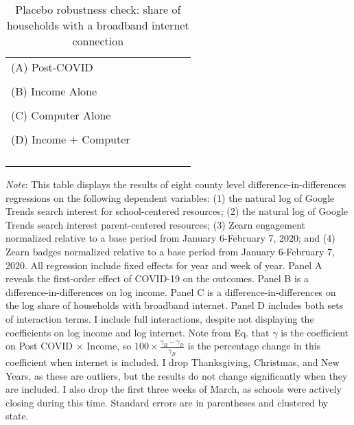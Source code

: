 \begin{table}[hbtp!]
    \caption{Placebo robustness check: share of households with a broadband internet connection}
    \label{tab:placebo_internet}
  \centering
  \begin{tabular}{l c c c c c}
    \toprule
     \\
    \midrule
    (A) Post-COVID \\
    \midrule
     \\
    \midrule
    (B) Income Alone \\
    \midrule
     \\
    \midrule
    (C) Computer Alone \\
    \midrule
     \\
    \midrule
    (D) Income + Computer \\
    \midrule
     \\
    \midrule
     \\
    \midrule
     \\
    \bottomrule \\
  \end{tabular}
  \begin{minipage}{\textwidth}
      \footnotesize
      \textit{Note}: This table displays the results of eight county level difference-in-differences regressions on the following dependent variables: (1) the natural log of Google Trends search interest for school-centered resources; (2) the natural log of Google Trends search interest parent-centered resources;  (3) Zearn engagement normalized relative to a base period from January 6-February 7,  2020; and (4) Zearn badges normalized relative to a base period from January 6-February 7,  2020. All regression include fixed effects for year and week of year.
      Panel A reveals the first-order effect of COVID-19 on the outcomes.
      Panel B is a difference-in-differences on log income.
      Panel C is a difference-in-differences on the log share of households with broadband internet.
      Panel D includes both sets of interaction terms.
      I include full interactions, despite not displaying the coefficients on log income and log internet.
      Note from Eq.  that $\gamma$ is the coefficient on Post COVID $\times$ Income, so
      $100 \times \frac{\gamma_B-\gamma_D}{\gamma_B}$ is the percentage change in this coefficient
      when internet is included.
      I drop Thanksgiving, Christmas, and New Years, as these are outliers, but the results do not change significantly when they are included.
      I also drop the first three weeks of March, as schools were actively closing during this time.
      Standard errors are in parentheses and clustered by state.
  \end{minipage}


\end{table}


